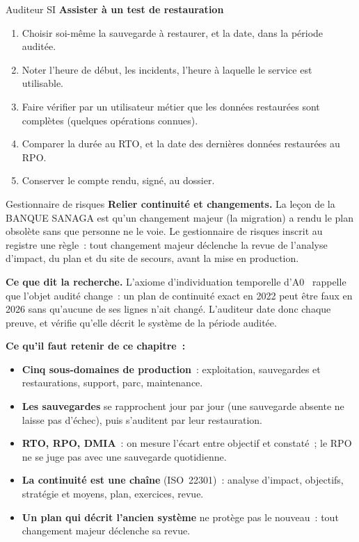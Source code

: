 \begin{boxmetier}{Auditeur SI}
\textbf{Assister à un test de restauration}
\begin{enumerate}
    \item Choisir soi-même la sauvegarde à restaurer, et la date, dans la
          période auditée.
    \item Noter l'heure de début, les incidents, l'heure à laquelle le
          service est utilisable.
    \item Faire vérifier par un utilisateur métier que les données
          restaurées sont complètes (quelques opérations connues).
    \item Comparer la durée au RTO, et la date des dernières données
          restaurées au RPO.
    \item Conserver le compte rendu, signé, au dossier.
\end{enumerate}
\end{boxmetier}

\begin{boxmetier}{Gestionnaire de risques}
\textbf{Relier continuité et changements.} La leçon de la BANQUE SANAGA
est qu'un changement majeur (la migration) a rendu le plan obsolète sans
que personne ne le voie. Le gestionnaire de risques inscrit au registre une
règle~: tout changement majeur déclenche la revue de l'analyse d'impact, du
plan et du site de secours, avant la mise en production.
\end{boxmetier}

\begin{boxinfo}
\textbf{Ce que dit la recherche.} L'axiome d'individuation temporelle
d'A0~\cite{minka2026auditologie} rappelle que l'objet audité change~: un
plan de continuité exact en 2022 peut être faux en 2026 sans qu'aucune de
ses lignes n'ait changé. L'auditeur date donc chaque preuve, et vérifie
qu'elle décrit le système de la période auditée.
\end{boxinfo}

\separateur

\begin{boxresume}
\textbf{Ce qu'il faut retenir de ce chapitre~:}
\begin{itemize}
    \item \textbf{Cinq sous-domaines de production}~: exploitation,
          sauvegardes et restaurations, support, parc, maintenance.
    \item \textbf{Les sauvegardes} se rapprochent jour par jour (une
          sauvegarde absente ne laisse pas d'échec), puis s'auditent par
          leur restauration.
    \item \textbf{RTO, RPO, DMIA}~: on mesure l'écart entre objectif et
          constaté~; le RPO ne se juge pas avec une sauvegarde quotidienne.
    \item \textbf{La continuité est une chaîne} (ISO~22301)~: analyse
          d'impact, objectifs, stratégie et moyens, plan, exercices, revue.
    \item \textbf{Un plan qui décrit l'ancien système} ne protège pas le
          nouveau~: tout changement majeur déclenche sa revue.
\end{itemize}
\end{boxresume}

